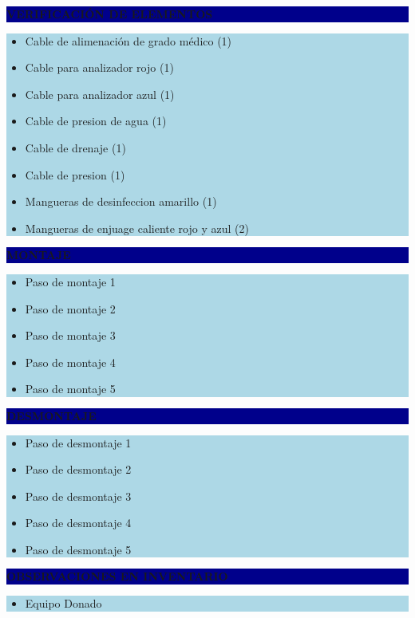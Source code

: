 \documentclass[11pt]{article}
\newcommand{\seccionbanda}[1]{%
  \vspace{0.6em}
  \noindent\colorbox{darkblue}{\parbox{\dimexpr\linewidth-2\fboxsep}{%
    \centering\color{white}\bfseries #1}}\par\vspace{0.6em}
}
\begin{document}
\newpage
\seccionbanda{VERIFICACIÓN DE ELEMENTOS}
\noindent\colorbox{lightblue}{\parbox{\dimexpr\linewidth-2\fboxsep\relax}{%
\begin{itemize}[label=$\square$, itemsep=4pt]
\item Cable de alimenación de grado médico (1)
\item Cable para analizador rojo (1)
\item Cable para analizador azul (1)
\item Cable de presion de agua (1)
\item Cable de drenaje (1)
\item Cable de presion (1)
\item Mangueras de desinfeccion amarillo (1)
\item Mangueras de enjuage caliente rojo y azul (2)
\end{itemize}
}}\par

\seccionbanda{MONTAJE}
\noindent\colorbox{lightblue}{\parbox{\dimexpr\linewidth-2\fboxsep\relax}{%
\begin{itemize}[label=$\square$, itemsep=4pt]
\item Paso de montaje 1
\item Paso de montaje 2
\item Paso de montaje 3
\item Paso de montaje 4
\item Paso de montaje 5
\end{itemize}
}}\par

\seccionbanda{DESMONTAJE}
\noindent\colorbox{lightblue}{\parbox{\dimexpr\linewidth-2\fboxsep\relax}{%
\begin{itemize}[label=$\square$, itemsep=4pt]
\item Paso de desmontaje 1
\item Paso de desmontaje 2
\item Paso de desmontaje 3
\item Paso de desmontaje 4
\item Paso de desmontaje 5
\end{itemize}
}}\par
\seccionbanda{OBSERVACIONES EN INVENTARIO}
\noindent\colorbox{lightblue}{\parbox{\dimexpr\linewidth-2\fboxsep\relax}{\begin{itemize}[itemsep=4pt]
\item Equipo Donado
\end{itemize}}}\par
\end{document}
